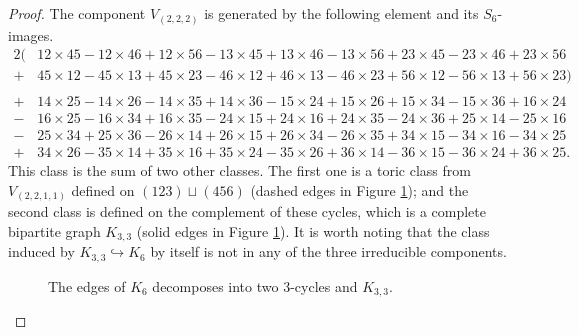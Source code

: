 \documentclass[12pt]{amsart}
\theoremstyle{definition}
\begin{document}
\begin{proof}
The component $V_{(2,2,2)}$ is generated by the following element and its $S_6$-images.
{\footnotesize \begin{align*}
2 (&{12} \times {45} 
-{12} \times {46} 
+{12} \times {56} 
-{13} \times {45} 
+{13} \times {46} 
-{13} \times {56} 
+{23} \times {45} 
-{23} \times {46} 
+{23} \times {56} \\
+&{45} \times {12}  
-{45} \times {13} 
+{45} \times {23} 
-{46} \times {12} 
+{46} \times {13} 
-{46} \times {23} 
+{56} \times {12} 
-{56} \times {13} 
+{56} \times {23}) \\
&\\
+&{14} \times {25} 
-{14} \times {26} 
-{14} \times {35} 
+{14} \times {36} 
-{15} \times {24} 
+{15} \times {26} 
+{15} \times {34} 
-{15} \times {36} 
+{16} \times {24}\\
-&{16} \times {25} 
-{16} \times {34} 
+{16} \times {35} 
-{24} \times {15} 
+{24} \times {16} 
+{24} \times {35} 
-{24} \times {36} 
+{25} \times {14} 
-{25} \times {16}\\
-&{25} \times {34} 
+{25} \times {36} 
-{26} \times {14} 
+{26} \times {15} 
+{26} \times {34} 
-{26} \times {35} 
+{34} \times {15} 
-{34} \times {16} 
-{34} \times {25}\\
+&{34} \times {26} 
-{35} \times {14} 
+{35} \times {16} 
+{35} \times {24} 
-{35} \times {26} 
+{36} \times {14} 
-{36} \times {15} 
-{36} \times {24} 
+{36} \times {25}.
\end{align*}}This class is the sum of two other classes. The first one is a toric class from $V_{(2,2,1,1)}$ defined on $(123)\sqcup (456)$ (dashed edges in Figure \ref{fig: K6}); and the second class is defined on the complement of these cycles, which is a complete bipartite graph $K_{3,3}$ (solid edges in Figure \ref{fig: K6}). It is worth noting that the class induced by $K_{3,3}\hookrightarrow K_6$ by itself is not in any of the three irreducible components.
\begin{figure}
\caption{The edges of $K_6$ decomposes into two 3-cycles and $K_{3,3}$.}
\label{fig: K6}
\end{figure}
\end{proof}
\end{document}
